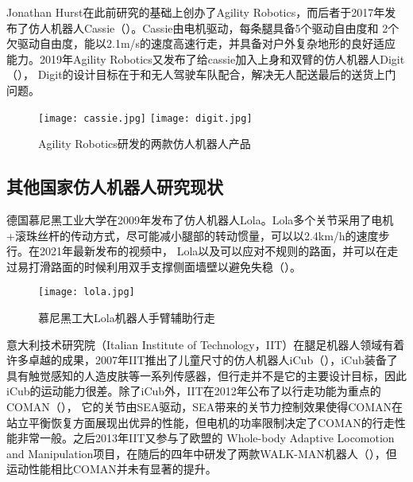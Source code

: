 Jonathan Hurst在此前研究的基础上创办了Agility Robotics，而后者于2017年发布了仿人机器人Cassie\cite{Cassie}（）。Cassie由电机驱动，每条腿具备5个驱动自由度和
2个欠驱动自由度，能以2.1m/s的速度高速行走，并具备对户外复杂地形的良好适应能力。2019年Agility Robotics又发布了给cassie加入上身和双臂的仿人机器人Digit\cite{Digit}（），
Digit的设计目标在于和无人驾驶车队配合，解决无人配送最后的送货上门问题。
\begin{figure}[htbp]
    \centering
        {%
            \texttt{[image: cassie.jpg]}}
    \hspace{1in}            
        {%
            \texttt{[image: digit.jpg]}}
    \caption{Agility Robotics研发的两款仿人机器人产品\label{fig:michigan_biped}}
\end{figure}
\subsection{其他国家仿人机器人研究现状}
德国慕尼黑工业大学在2009年发布了仿人机器人Lola\cite{buschmann2009humanoid}。Lola多个关节采用了电机+滚珠丝杆的传动方式，尽可能减小腿部的转动惯量，可以以2.4km/h的速度步行。在2021年最新发布的视频中，
Lola以及可以应对不规则的路面，并可以在走过易打滑路面的时候利用双手支撑侧面墙壁以避免失稳\cite{Lola}（）。
\begin{figure}[htbp]
    \centering
    \texttt{[image: lola.jpg]}
    \caption{\label{fig:lola}慕尼黑工大Lola机器人手臂辅助行走}
\end{figure}
意大利技术研究院（Italian Institute of Technology，IIT）在腿足机器人领域有着许多卓越的成果，2007年IIT推出了儿童尺寸的仿人机器人iCub\cite{tsagarakis2007icub}（），iCub装备了
具有触觉感知的人造皮肤等一系列传感器，但行走并不是它的主要设计目标，因此iCub的运动能力很差。除了iCub外，IIT在2012年公布了以行走功能为重点的COMAN\cite{dallali2012global}（），
它的关节由SEA驱动，SEA带来的关节力控制效果使得COMAN在站立平衡恢复方面展现出优异的性能，但电机的功率限制决定了COMAN的行走性能非常一般。之后2013年IIT又参与了欧盟的
Whole-body Adaptive Locomotion and Manipulation项目，在随后的四年中研发了两款WALK-MAN机器人\cite{tsagarakis2017walk}（），但运动性能相比COMAN并未有显著的提升。

